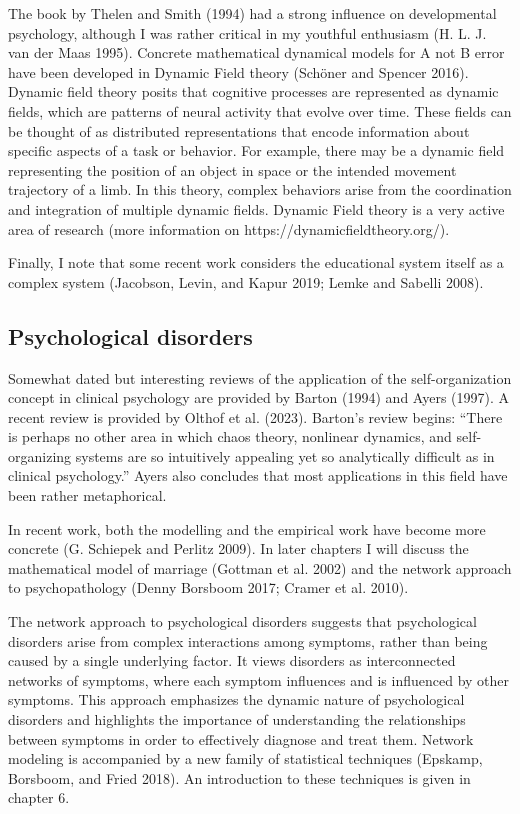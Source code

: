 \documentclass[
  letterpaper,
]{scrbook}
\begin{document}
The book by Thelen and Smith (1994) had a strong influence on
developmental psychology, although I was rather critical in my youthful
enthusiasm (H. L. J. van der Maas 1995). Concrete mathematical dynamical
models for A not B error have been developed in Dynamic Field theory
(Schöner and Spencer 2016). Dynamic field theory posits that cognitive
processes are represented as dynamic fields, which are patterns of
neural activity that evolve over time. These fields can be thought of as
distributed representations that encode information about specific
aspects of a task or behavior. For example, there may be a dynamic field
representing the position of an object in space or the intended movement
trajectory of a limb. In this theory, complex behaviors arise from the
coordination and integration of multiple dynamic fields. Dynamic Field
theory is a very active area of research (more information on
https://dynamicfieldtheory.org/).

Finally, I note that some recent work considers the educational system
itself as a complex system (Jacobson, Levin, and Kapur 2019; Lemke and
Sabelli 2008).

\hypertarget{psychological-disorders}{%
\subsection{Psychological disorders}\label{psychological-disorders}}

Somewhat dated but interesting reviews of the application of the
self-organization concept in clinical psychology are provided by Barton
(1994) and Ayers (1997). A recent review is provided by Olthof et al.
(2023). Barton's review begins: ``There is perhaps no other area in
which chaos theory, nonlinear dynamics, and self-organizing systems are
so intuitively appealing yet so analytically difficult as in clinical
psychology.'' Ayers also concludes that most applications in this field
have been rather metaphorical.

In recent work, both the modelling and the empirical work have become
more concrete (G. Schiepek and Perlitz 2009). In later chapters I will
discuss the mathematical model of marriage (Gottman et al. 2002) and the
network approach to psychopathology (Denny Borsboom 2017; Cramer et al.
2010).

The network approach to psychological disorders suggests that
psychological disorders arise from complex interactions among symptoms,
rather than being caused by a single underlying factor. It views
disorders as interconnected networks of symptoms, where each symptom
influences and is influenced by other symptoms. This approach emphasizes
the dynamic nature of psychological disorders and highlights the
importance of understanding the relationships between symptoms in order
to effectively diagnose and treat them. Network modeling is accompanied
by a new family of statistical techniques (Epskamp, Borsboom, and Fried
2018). An introduction to these techniques is given in chapter 6.
\end{document}
